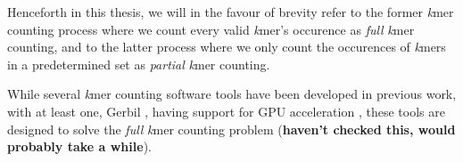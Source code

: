 Henceforth in this thesis, we will in the favour of brevity refer to the former \textit{k}mer counting process where we count every valid \textit{k}mer's occurence as \textit{full} \textit{k}mer counting, and to the latter process where we only count the occurences of \textit{k}mers in a predetermined set as \textit{partial} \textit{k}mer counting.

While several \textit{k}mer counting software tools have been developed in previous work, with at least one, Gerbil \cite{gerbil}, having support for GPU acceleration \cite{kmer_counting_tools}, these tools are designed to solve the \textit{full} \textit{k}mer counting problem (\textbf{haven't checked this, would probably take a while}).
